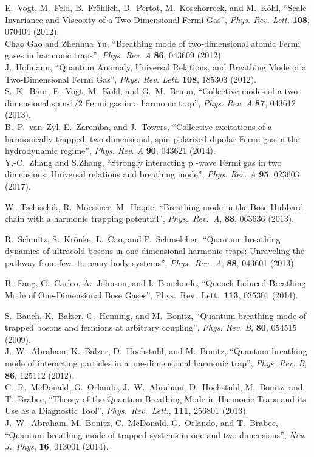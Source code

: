 \documentclass[a4paper, onecolumn]{revtex4-1}
\begin{document}
\begin{thebibliography}{1}
E.~Vogt, M.~Feld, B.~Fr\"ohlich, D.~Pertot, M.~Koschorreck, and M.~K\"ohl, ``Scale Invariance and
Viscosity of a Two-Dimensional Fermi Gas'', {\em Phys. Rev. Lett.} {\bf 108}, 070404 (2012).
%
\\ 
%
Chao Gao and Zhenhua Yu, ``Breathing mode of two-dimensional atomic Fermi gases in harmonic traps'',
{\em Phys. Rev. A} {\bf 86}, 043609 (2012).
%
\\ 
%
J.~Hofmann, ``Quantum Anomaly, Universal Relations, and Breathing Mode of a Two-Dimensional Fermi
Gas'', {\em Phys. Rev. Lett.} {\bf 108}, 185303 (2012).
%
\\ 
%
S.~K.~Baur, E.~Vogt, M.~K\"ohl, and G.~M.~Bruun, ``Collective modes of a two-dimensional spin-1/2
Fermi gas in a harmonic trap'', {\em Phys. Rev. A} {\bf 87}, 043612 (2013).
%
\\ 
%
B.~P.~van~Zyl, E.~Zaremba, and J.~Towers,
``Collective excitations of a harmonically trapped, two-dimensional, spin-polarized dipolar Fermi
gas in the hydrodynamic regime'', 
{\em Phys. Rev. A} {\bf 90}, 043621 (2014). 
%
\\ 
%
Y.-C.~Zhang and S.Zhang, ``Strongly interacting p -wave Fermi gas in two dimensions:
Universal relations and breathing mode'', {\em Phys. Rev. A} {\bf 95}, 023603 (2017).


 W.~Tschischik, R.~Moessner, M.~Haque, 
``Breathing mode in the Bose-Hubbard chain with a harmonic trapping potential'', 
{\em Phys.\ Rev.~A}, \textbf{88}, 063636 (2013).

 R.~Schmitz, S.~Kr\"onke, L.~Cao, and 
  P.~Schmelcher, ``Quantum breathing dynamics of ultracold bosons in one-dimensional harmonic traps:
  Unraveling the pathway from few- to many-body systems'', 
{\em Phys.\ Rev.\ A}, \textbf{88}, 043601 (2013).

B.~Fang, G.~Carleo, A.~Johnson, and I.~Bouchoule,  
``Quench-Induced Breathing Mode of One-Dimensional Bose Gases'', 
Phys.\ Rev.\ Lett.\ \textbf{113}, 035301 (2014).   



%
S.~Bauch, K.~Balzer, C.~Henning, and M.~Bonitz, 
``Quantum breathing mode of trapped bosons and fermions at arbitrary coupling'', 
{\em Phys. Rev. B}, \textbf{80}, 054515 (2009).
%
\\
%
J.~W.~Abraham, K.~Balzer, D.~Hochstuhl, and M.~Bonitz, 
``Quantum breathing mode of interacting particles in a one-dimensional harmonic trap'', 
{\em Phys. Rev. B}, \textbf{86}, 125112 (2012).
%
\\
%
C.~R.~McDonald, G.~Orlando, J.~W.~Abraham, D.~Hochstuhl, M.~Bonitz, and T.~Brabec, 
``Theory of the Quantum Breathing Mode in Harmonic Traps and its Use as a Diagnostic Tool'', 
{\em Phys.\ Rev.\ Lett.}, \textbf{111}, 256801 (2013).
%
\\
%
J.~W.~Abraham, M.~Bonitz, C.~McDonald, G.~Orlando, and T.~Brabec, 
``Quantum breathing mode of trapped systems in one and two dimensions'', 
{\em New J.~Phys}, \textbf{16}, 013001 (2014).




\end{thebibliography}
\end{document}
